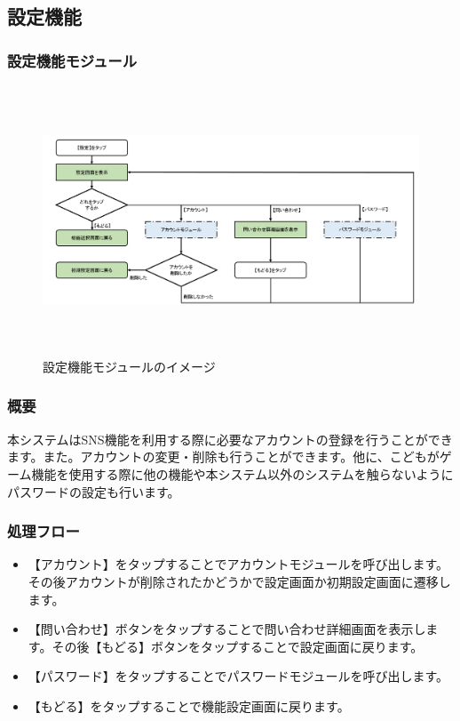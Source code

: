\documentclass[a4j]{jarticle}
\begin{document}
\subsection{設定機能}
\subsubsection{設定機能モジュール\label{設定機能}} %
\begin{figure}[H]
    \begin{center}
      \includegraphics[height=8.0cm] {設定_全体.png} %
    \caption {設定機能モジュールのイメージ}
    \label{functionselection}
    \end{center}
\end{figure}
\subsubsection*{概要}
本システムはSNS機能を利用する際に必要なアカウントの登録を行うことができます。また。アカウントの変更・削除も行うことができます。他に、こどもがゲーム機能を使用する際に他の機能や本システム以外のシステムを触らないようにパスワードの設定も行います。
\subsubsection*{処理フロー}
\begin{itemize}
\item 【アカウント】をタップすることでアカウントモジュールを呼び出します。その後アカウントが削除されたかどうかで設定画面か初期設定画面に遷移します。

\item 【問い合わせ】ボタンをタップすることで問い合わせ詳細画面を表示します。その後【もどる】ボタンをタップすることで設定画面に戻ります。

\item 【パスワード】をタップすることでパスワードモジュールを呼び出します。

\item 【もどる】をタップすることで機能設定画面に戻ります。
\end{itemize}
\end{document}
